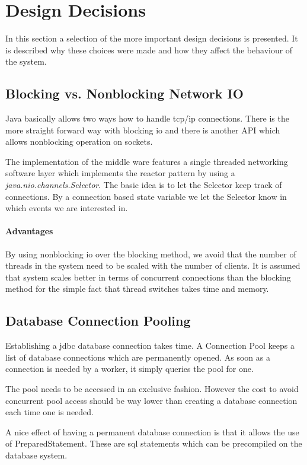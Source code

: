\documentclass[milestone1.tex]{subfiles}
\begin{document}
\section{Design Decisions}

In this section a selection of the more important design decisions is presented. It is described why these choices were made and how they affect the behaviour of the system.

\subsection{Blocking vs. Nonblocking Network IO}
Java basically allows two ways how to handle tcp/ip connections. There is the more straight forward way with blocking io and there is another API which allows nonblocking operation on sockets.

The implementation of the middle ware features a single threaded networking software layer which implements the reactor pattern by using a \textit{java.nio.channels.Selector}. The basic idea is to let the Selector keep track of connections. By a connection based state variable we let the Selector know in which events we are interested in.

\paragraph{Advantages}
By using nonblocking io over the blocking method, we avoid that the number of threads in the system need to be scaled with the number of clients. It is assumed that system scales better in terms of concurrent connections than the blocking method for the simple fact that thread switches takes time and memory.

\subsection{Database Connection Pooling}
Establishing a jdbc database connection takes time. A Connection Pool keeps a list of database connections which are permanently opened. As soon as a connection is needed by a worker, it simply queries the pool for one.

The pool needs to be accessed in an exclusive fashion. However the cost to avoid concurrent pool access should be way lower than creating a database connection each time one is needed.

A nice effect of having a permanent database connection is that it allows the use of PreparedStatement. These are sql statements which can be precompiled on the database system.
\end{document}
